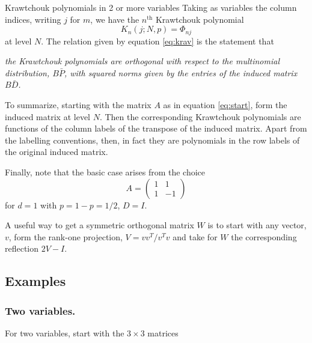 \documentclass[runningheads]{llncs}
\begin{document}
\begin{section}{Krawtchouk polynomials in 2 or more variables}
Taking as variables the column indices, writing $j$ for $m$, we have the $n^{\text{th}}$ Krawtchouk polynomial
$$K_n(j;N,p)=\Phi_{nj}$$
at level $N$. The relation given by equation \eqref{eq:krav} is the statement that \bigskip

\textit{
the Krawtchouk polynomials are orthogonal with respect
to the multinomial distribution, $B\bar P$, with squared norms given by the entries of the induced matrix $B\bar D$.
}\bigskip

To summarize, starting with the matrix $A$ as in equation \eqref{eq:start}, form the induced matrix at level $N$. Then the
corresponding Krawtchouk polynomials are functions of the column labels of the transpose of the induced matrix.
Apart from the labelling conventions, then, in fact they are polynomials in the row labels of the original induced matrix.

Finally, note that the basic case arises from the choice
$$A=\begin{pmatrix} 1&1\\ 1& -1\end{pmatrix}$$
for $d=1$ with $p=1-p=1/2$, $D=I$.

\begin{remark} A useful way to get a symmetric orthogonal matrix $W$ is to start with any vector, $v$, form the rank-one projection,
$V=vv^T/v^Tv$ and take for $W$ the corresponding reflection $2V-I$.
\end{remark}

\subsection{Examples}
\subsubsection{Two variables. }

For two variables, start with the $3\times3$ matrices


\end{section}
\end{document}
